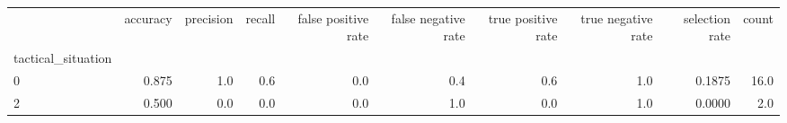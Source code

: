 \begin{tabular}{lrrrrrrrrr}
\toprule
{} &  accuracy &  precision &  recall &  false positive rate &  false negative rate &  true positive rate &  true negative rate &  selection rate &  count \\
tactical\_situation &           &            &         &                      &                      &                     &                     &                 &        \\
\midrule
0                  &     0.875 &        1.0 &     0.6 &                  0.0 &                  0.4 &                 0.6 &                 1.0 &          0.1875 &   16.0 \\
2                  &     0.500 &        0.0 &     0.0 &                  0.0 &                  1.0 &                 0.0 &                 1.0 &          0.0000 &    2.0 \\
\bottomrule
\end{tabular}
